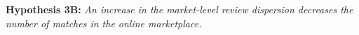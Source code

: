 \documentclass[msom,blindrev]{informs3}
\begin{document}
	\noindent\textbf{Hypothesis 3B:} \emph{An increase in the market-level review dispersion decreases the number of matches in the online marketplace.}
	
	
	
	
\end{document}
